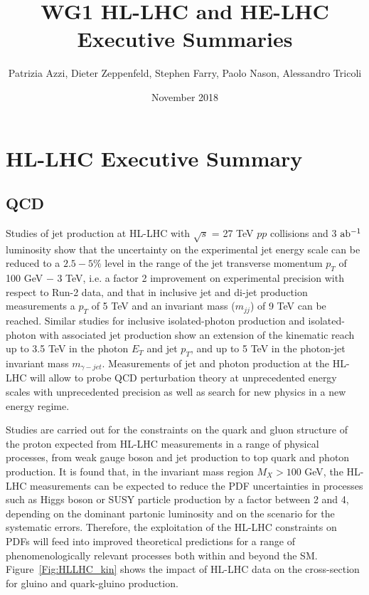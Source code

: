 \documentclass{article}
\title{WG1 HL-LHC and HE-LHC Executive Summaries}
\author{Patrizia Azzi, Dieter Zeppenfeld, Stephen Farry, Paolo Nason, Alessandro Tricoli }
\date{November 2018}
\begin{document}
\maketitle

\section{HL-LHC Executive Summary}


\subsection{QCD}

Studies of jet production at HL-LHC with $\sqrt{s}$ = 27 TeV $pp$ collisions and 3 ${\rm ab^{-1}}$ luminosity show that the uncertainty on the experimental jet energy scale can be reduced to a $2.5-5\%$ level in the range of the jet transverse momentum $p_T$ of 100 GeV $-$ 3 TeV, i.e. a factor 2 improvement on experimental precision with respect to Run-2 data, and that in inclusive jet and di-jet production measurements a $p_T$ of 5 TeV and an invariant mass ($m_{jj}$) of 9 TeV can be reached. Similar studies for inclusive isolated-photon production and isolated-photon with associated jet production show an extension of the kinematic reach up to 3.5 TeV in the photon $E_T$ and jet $p_T$, and up to 5 TeV in the photon-jet invariant mass $m_{\gamma - jet}$. Measurements of jet and photon production at the HL-LHC will allow to probe QCD perturbation theory at unprecedented energy scales with unprecedented precision as well as search for new physics in a new energy regime. 

\vspace{5mm}
\noindent
Studies are carried out for the constraints on the quark and gluon structure of the proton expected from HL-LHC measurements in a range of physical
processes, from weak gauge boson and jet production to top quark and photon production. It is found that, in the invariant mass region $M_X > 100$ GeV, the HL-LHC measurements can be
expected to reduce the PDF uncertainties in processes such as Higgs boson or SUSY particle production
by a factor between 2 and 4, depending on the dominant partonic luminosity and on the scenario for the
systematic errors. Therefore, the exploitation of the HL-LHC constraints
on PDFs will feed into improved theoretical predictions for a range of phenomenologically relevant processes both within and beyond the SM. Figure~\ref{Fig:HLLHC_kin} shows the impact of HL-LHC data on the cross-section for gluino and quark-gluino production. 
\end{document}
